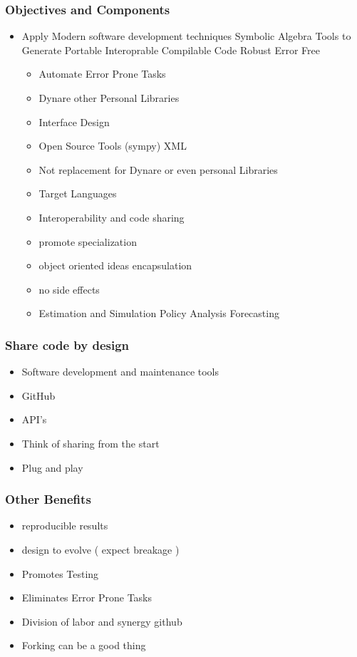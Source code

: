 \documentclass{beamer}
\begin{document}
\begin{frame}
  \frametitle{Objectives and Components}  

{\small
\begin{itemize}
\item Apply Modern software development techniques 
Symbolic Algebra Tools to Generate Portable Interoprable Compilable Code  Robust
Error Free
  \begin{itemize}
  \item Automate Error Prone Tasks
  \item Dynare other Personal Libraries
  \item Interface Design
  \item Open Source Tools  (sympy)  XML
  \item Not replacement for Dynare or even personal Libraries
  \item Target Languages
  \item Interoperability and code sharing
  \item promote specialization
  \item object oriented ideas encapsulation
  \item no side effects
  \item Estimation and Simulation  Policy Analysis Forecasting
  \end{itemize}
\end{itemize}

}
\end{frame}
\begin{frame}
\frametitle{Share code by design}
\begin{itemize}
\item Software development and maintenance tools
\item GitHub
\item API's
\item Think of sharing from the start
\item Plug and play
\end{itemize}
\end{frame}

\begin{frame}
  \frametitle{Other Benefits}
  \begin{itemize}
  \item reproducible results
  \item design to evolve ( expect breakage )
  \item Promotes Testing
  \item Eliminates Error Prone Tasks
  \item Division of labor and synergy  github
  \item Forking can be a good thing
  \end{itemize}
\end{frame}
\end{document}
